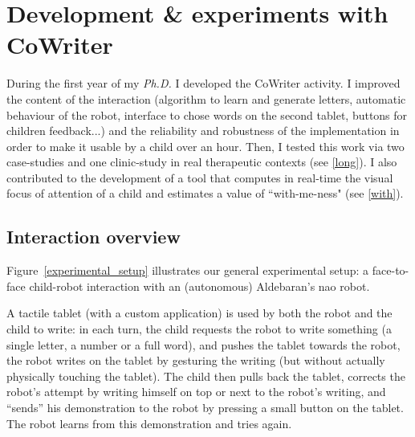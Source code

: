 \documentclass[10pt,a4paper]{article}
\begin{document}
\section{Development \& experiments with CoWriter}
During the first year of my \textit{Ph.D.} I developed the CoWriter activity. I improved the content of the interaction (algorithm to learn and generate letters, automatic behaviour of the robot, interface to chose words on the second tablet, buttons for children feedback...) and the reliability and robustness of the implementation in order to make it usable by a child over an hour. Then, I tested this work via two case-studies and one clinic-study in real therapeutic contexts (see \ref{long}). I also contributed to the development of a tool that computes in real-time the visual focus of attention of a child and estimates a value of ``with-me-ness" (see \ref{with}).

\subsection{Interaction overview}
Figure~\ref{experimental_setup} illustrates our general experimental setup: a
face-to-face child-robot interaction with an (autonomous) Aldebaran's {\sc nao}
robot.

A tactile tablet (with a custom application) is used by both the robot and the
child to write: in each turn, the child requests the robot to write
something (a single letter, a number or a full word), and pushes the tablet
towards the robot, the robot writes on the tablet by gesturing the writing (but
without actually physically touching the tablet). The child then pulls back the
tablet, corrects the robot's attempt by writing himself on top or next to
the robot's writing, and ``sends'' his
demonstration to the robot by pressing a small button on the tablet. The robot
learns from this demonstration and tries again.
\end{document}
